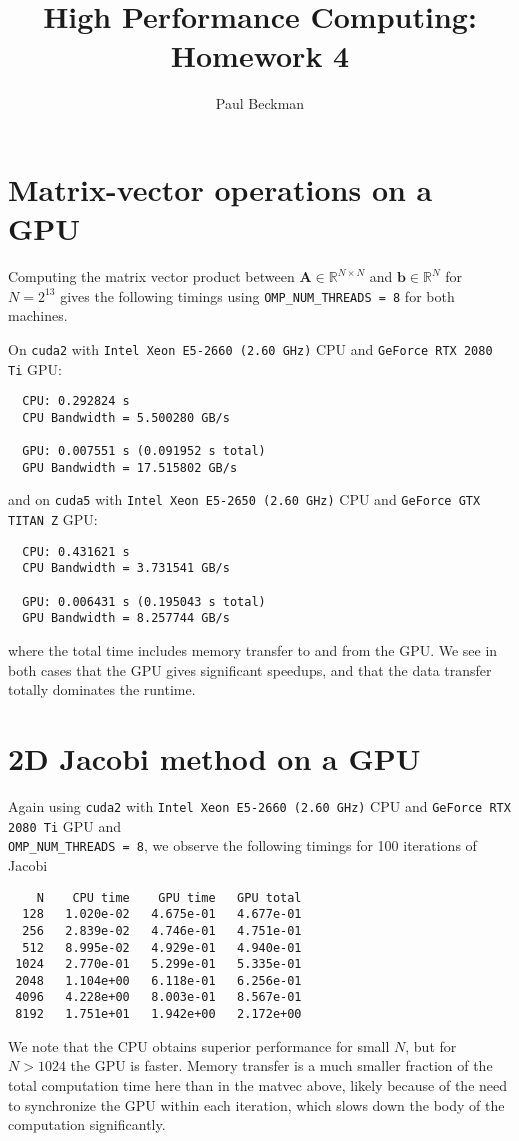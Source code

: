\documentclass{article}
\title{High Performance Computing: Homework 4}
\author{Paul Beckman}
\date{}
\newcommand{\R}{\mathbb{R}}
\begin{document}
\maketitle

\section{Matrix-vector operations on a GPU}
Computing the matrix vector product between $\bm{A} \in \R^{N \times N}$ and $\bm{b} \in \R^N$ for $N = 2^{13}$ gives the following timings using \texttt{OMP\_NUM\_THREADS = 8} for both machines.

On \texttt{cuda2} with \texttt{Intel Xeon E5-2660 (2.60 GHz)} CPU and \texttt{GeForce RTX 2080 Ti} GPU:
\begin{verbatim}
  CPU: 0.292824 s
  CPU Bandwidth = 5.500280 GB/s

  GPU: 0.007551 s (0.091952 s total)
  GPU Bandwidth = 17.515802 GB/s 
\end{verbatim}
and on \texttt{cuda5} with \texttt{Intel Xeon E5-2650 (2.60 GHz)} CPU and \texttt{GeForce GTX TITAN Z} GPU:
\begin{verbatim}
  CPU: 0.431621 s
  CPU Bandwidth = 3.731541 GB/s

  GPU: 0.006431 s (0.195043 s total)
  GPU Bandwidth = 8.257744 GB/s 
\end{verbatim}
where the total time includes memory transfer to and from the GPU. We see in both cases that the GPU gives significant speedups, and that the data transfer totally dominates the runtime.

\section{2D Jacobi method on a GPU}
Again using \texttt{cuda2} with \texttt{Intel Xeon E5-2660 (2.60 GHz)} CPU and \texttt{GeForce RTX 2080 Ti} GPU and \\ \texttt{OMP\_NUM\_THREADS = 8}, we observe the following timings for 100 iterations of Jacobi
\begin{verbatim}
    N    CPU time    GPU time   GPU total
  128   1.020e-02   4.675e-01   4.677e-01
  256   2.839e-02   4.746e-01   4.751e-01
  512   8.995e-02   4.929e-01   4.940e-01
 1024   2.770e-01   5.299e-01   5.335e-01
 2048   1.104e+00   6.118e-01   6.256e-01
 4096   4.228e+00   8.003e-01   8.567e-01
 8192   1.751e+01   1.942e+00   2.172e+00
\end{verbatim}
We note that the CPU obtains superior performance for small $N$, but for $N > 1024$ the GPU is faster. Memory transfer is a much smaller fraction of the total computation time here than in the matvec above, likely because of the need to synchronize the GPU within each iteration, which slows down the body of the computation significantly.
\end{document}

